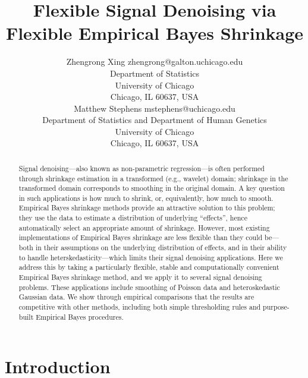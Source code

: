 \documentclass[twoside]{article}
\begin{document}
\title{\textbf{Flexible Signal Denoising via Flexible Empirical Bayes
    Shrinkage}}

\author{\name Zhengrong Xing \email zhengrong@galton.uchicago.edu\\ 
\addr Department of Statistics \\
University of Chicago \\
Chicago, IL 60637, USA \\
\AND 
\name Matthew Stephens \email mstephens@uchicago.edu \\ 
\addr Department of Statistics and Department of Human Genetics \\
University of Chicago \\
Chicago, IL 60637, USA}
\date{}
\maketitle


\begin{abstract}
Signal denoising---also known as non-parametric regression---is often
performed through shrinkage estimation in a transformed (e.g.,
wavelet) domain; shrinkage in the transformed domain corresponds to
smoothing in the original domain. A key question in such applications
is how much to shrink, or, equivalently, how much to smooth. Empirical
Bayes shrinkage methods provide an attractive solution to this
problem; they use the data to estimate a distribution of underlying
``effects'', hence automatically select an appropriate amount of
shrinkage. However, most existing implementations of Empirical Bayes
shrinkage are less flexible than they could be---both in their
assumptions on the underlying distribution of effects, and in their
ability to handle heterskedasticity---which limits their signal
denoising applications. Here we address this by taking a particularly
flexible, stable and computationally convenient Empirical Bayes
shrinkage method, and we apply it to several signal denoising
problems. These applications include smoothing of Poisson data and
heteroskedastic Gaussian data. We show through empirical comparisons
that the results are competitive with other methods, including both
simple thresholding rules and purpose-built Empirical Bayes
procedures.
\end{abstract}

\section{Introduction}
\end{document}

